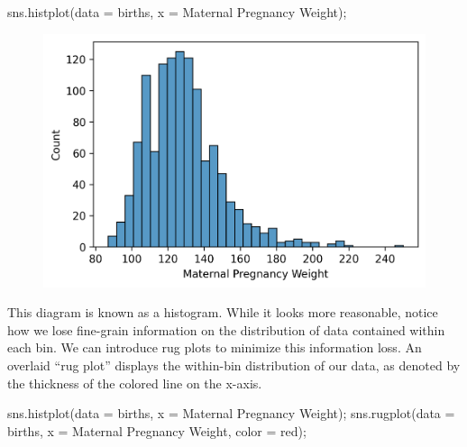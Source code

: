 \documentclass[
  letterpaper,
  DIV=11,
  numbers=noendperiod]{scrreprt}
\newenvironment{Shaded}{\begin{snugshade}}{\end{snugshade}}
\newcommand{\NormalTok}[1]{\textcolor[rgb]{0.00,0.23,0.31}{#1}}
\newcommand{\OperatorTok}[1]{\textcolor[rgb]{0.37,0.37,0.37}{#1}}
\newcommand{\StringTok}[1]{\textcolor[rgb]{0.13,0.47,0.30}{#1}}
\begin{document}
\begin{Shaded}
\begin{Highlighting}[]
\NormalTok{sns.histplot(data }\OperatorTok{=}\NormalTok{ births, x }\OperatorTok{=} \StringTok{\textquotesingle{}Maternal Pregnancy Weight\textquotesingle{}}\NormalTok{)}\OperatorTok{;}
\end{Highlighting}
\end{Shaded}

\begin{figure}[H]

{\centering \includegraphics{visualization_1/visualization_1_files/figure-pdf/cell-8-output-1.png}

}

\end{figure}

This diagram is known as a histogram. While it looks more reasonable,
notice how we lose fine-grain information on the distribution of data
contained within each bin. We can introduce rug plots to minimize this
information loss. An overlaid ``rug plot'' displays the within-bin
distribution of our data, as denoted by the thickness of the colored
line on the x-axis.

\begin{Shaded}
\begin{Highlighting}[]
\NormalTok{sns.histplot(data }\OperatorTok{=}\NormalTok{ births, x }\OperatorTok{=} \StringTok{\textquotesingle{}Maternal Pregnancy Weight\textquotesingle{}}\NormalTok{)}\OperatorTok{;}
\NormalTok{sns.rugplot(data }\OperatorTok{=}\NormalTok{ births, x }\OperatorTok{=} \StringTok{\textquotesingle{}Maternal Pregnancy Weight\textquotesingle{}}\NormalTok{, color }\OperatorTok{=} \StringTok{\textquotesingle{}red\textquotesingle{}}\NormalTok{)}\OperatorTok{;}
\end{Highlighting}
\end{Shaded}
\end{document}
